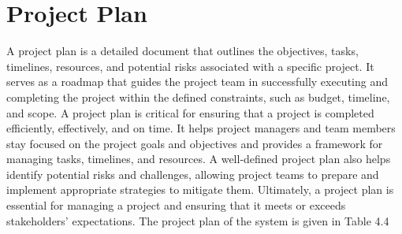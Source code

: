 \documentclass[12pt]{report}
\begin{document}
\section{Project Plan}

A project plan is a detailed document that outlines the objectives, tasks, timelines, resources, and potential risks associated with a specific project. It serves as a roadmap that guides the project team in successfully executing and completing the project within the defined constraints, such as budget, timeline, and scope. \newline \newline
A project plan is critical for ensuring that a project is completed efficiently, effectively, and on time. It helps project managers and team members stay focused on the project goals and objectives and provides a framework for managing tasks, timelines, and resources. A well-defined project plan also helps identify potential risks and challenges, allowing project teams to prepare and implement appropriate strategies to mitigate them. Ultimately, a project plan is essential for managing a project and ensuring that it meets or exceeds stakeholders' expectations. The project plan of the system is given in Table 4.4
\newline
\end{document}
